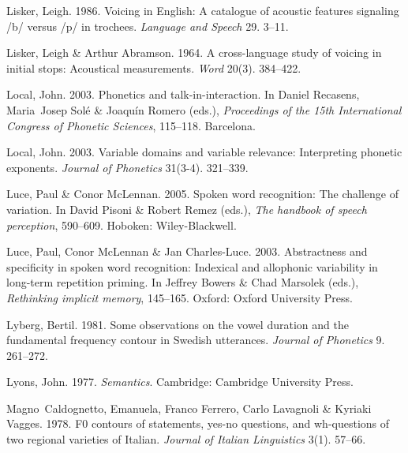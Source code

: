 \documentclass[ number=1
,series=labphon
,output=long
,url=http://langsci-press.org/catalog/book/16
,isbn=978-3-944675-01-5
]{LSP/langsci}
\begin{document}
\begin{thebibliography}{284}
Lisker, Leigh. 1986.
\newblock Voicing in {E}nglish: {A} catalogue of acoustic features signaling
  /b/ versus /p/ in trochees.
\newblock \emph{Language and Speech} 29. 3--11.

Lisker, Leigh \& Arthur Abramson. 1964.
\newblock A cross-language study of voicing in initial stops: {A}coustical
  measurements.
\newblock \emph{Word} 20(3). 384--422.

Local, John. 2003{}.
\newblock Phonetics and talk-in-interaction.
\newblock In Daniel Recasens, Maria~Josep Sol\'{e} \& Joaquín Romero (eds.),
  \emph{Proceedings of the 15th {I}nternational {C}ongress of {P}honetic
  {S}ciences}, 115--118. Barcelona.

Local, John. 2003{}.
\newblock Variable domains and variable relevance: {I}nterpreting phonetic
  exponents.
\newblock \emph{Journal of Phonetics} 31(3-4). 321--339.

Luce, Paul \& Conor McLennan. 2005.
\newblock Spoken word recognition: {T}he challenge of variation.
\newblock In David Pisoni \& Robert Remez (eds.), \emph{The handbook of speech
  perception}, 590--609. Hoboken: Wiley-Blackwell.

Luce, Paul, Conor McLennan \& Jan Charles-Luce. 2003.
\newblock Abstractness and specificity in spoken word recognition: {I}ndexical
  and allophonic variability in long-term repetition priming.
\newblock In Jeffrey Bowers \& Chad Marsolek (eds.), \emph{Rethinking implicit
  memory}, 145--165. Oxford: Oxford University Press.

Lyberg, Bertil. 1981.
\newblock Some observations on the vowel duration and the fundamental frequency
  contour in {S}wedish utterances.
\newblock \emph{Journal of Phonetics} 9. 261--272.

Lyons, John. 1977.
\newblock \emph{Semantics}.
\newblock Cambridge: Cambridge University Press.

Magno~Caldognetto, Emanuela, Franco Ferrero, Carlo Lavagnoli \& Kyriaki Vagges.
  1978.
\newblock F0 contours of statements, yes-no questions, and wh-questions of two
  regional varieties of {I}talian.
\newblock \emph{Journal of Italian Linguistics} 3(1). 57--66.


\end{thebibliography}
\end{document}
